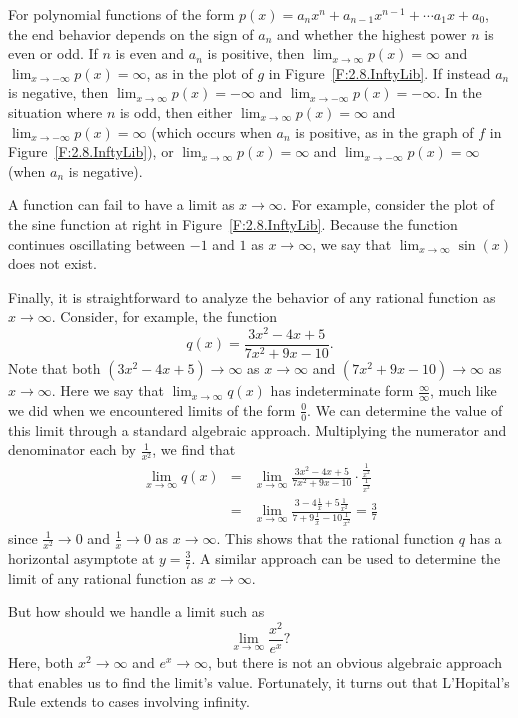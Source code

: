 For polynomial functions of the form $p(x) = a_n x^n + a_{n-1}x^{n-1} + \cdots a_1 x + a_0$, the end behavior depends on the sign of $a_n$ and whether the highest power $n$ is even or odd.  If $n$ is even and $a_n$ is positive, then $\lim_{x \to \infty} p(x) = \infty$ and $\lim_{x \to -\infty} p(x) = \infty$, as in the plot of $g$ in Figure~\ref{F:2.8.InftyLib}.  If instead $a_n$ is negative, then $\lim_{x \to \infty} p(x) = -\infty$ and $\lim_{x \to -\infty} p(x) = -\infty$.  In the situation where $n$ is odd, then either $\lim_{x \to \infty} p(x) = \infty$ and $\lim_{x \to -\infty} p(x) = \infty$ (which occurs when $a_n$ is positive, as in the graph of $f$ in Figure~\ref{F:2.8.InftyLib}), or $\lim_{x \to \infty} p(x) = \infty$ and $\lim_{x \to -\infty} p(x) = \infty$ (when $a_n$ is negative).

A function can fail to have a limit as $x \to \infty$.  For example, consider the plot of the sine function at right in Figure~\ref{F:2.8.InftyLib}.  Because the function continues oscillating between $-1$ and $1$ as $x \to \infty$, we say that $\lim_{x \to \infty} \sin(x)$ does not exist.

Finally, it is straightforward to analyze the behavior of any rational function as $x \to \infty$.  Consider, for example, the function 
$$q(x) =  \frac{3x^2 - 4x + 5}{7x^2 + 9x - 10}.$$
Note that both $(3x^2 - 4x + 5) \to \infty$ as $x \to \infty$ and $(7x^2 + 9x - 10) \to \infty$ as $x \to \infty$.  Here we say that $\lim_{x \to \infty} q(x)$ has indeterminate form $\frac{\infty}{\infty}$, much like we did when we encountered limits of the form $\frac{0}{0}$.  We can determine the value of this limit through a standard algebraic approach.  Multiplying the numerator and denominator each by $\frac{1}{x^2}$, we find that
\begin{eqnarray*}
	\lim_{x \to \infty} q(x) & = & \lim_{x \to \infty} \frac{3x^2 - 4x + 5}{7x^2 + 9x - 10} \cdot \frac{\frac{1}{x^2}}{\frac{1}{x^2}} \\
					& = & \lim_{x \to \infty} \frac{3 - 4\frac{1}{x} + 5\frac{1}{x^2}}{7 + 9\frac{1}{x} - 10\frac{1}{x^2}} = \frac{3}{7}
\end{eqnarray*}
since $\frac{1}{x^2} \to 0$ and $\frac{1}{x} \to 0$ as $x \to \infty$.  This shows that the rational function $q$ has a horizontal asymptote at $y = \frac{3}{7}$.  A similar approach can be used to determine the limit of any rational function as $x \to \infty$.

But how should we handle a limit such as
$$\lim_{x \to \infty} \frac{x^2}{e^x}?$$
Here, both $x^2 \to \infty$ and $e^x \to \infty$, but there is not an obvious algebraic approach that enables us to find the limit's value.  Fortunately, it turns out that L'Hopital's Rule extends to cases involving infinity.

